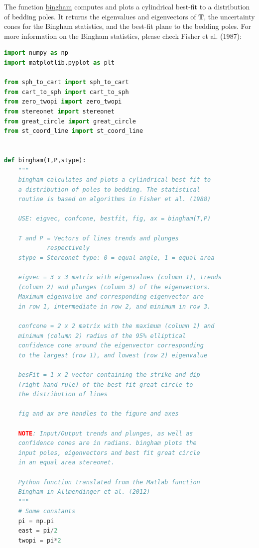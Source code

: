 \documentclass[a4paper , 12pt]{book}
\begin{document}
The function \href{https://github.com/nfcd/compGeo/blob/master/source/functions/bingham.py}{bingham} computes and plots a cylindrical best-fit to a distribution of bedding poles. It returns the eigenvalues and eigenvectors of $\mathbf{T}$, the uncertainty cones for the Bingham statistics, and the best-fit plane to the bedding poles. For more information on the Bingham statistics, please check Fisher et al. (1987):

\begin{center}
\begin{lstlisting}[language=Python, frame=single]
import numpy as np
import matplotlib.pyplot as plt

from sph_to_cart import sph_to_cart
from cart_to_sph import cart_to_sph
from zero_twopi import zero_twopi
from stereonet import stereonet
from great_circle import great_circle
from st_coord_line import st_coord_line


def bingham(T,P,stype):
	"""
	bingham calculates and plots a cylindrical best fit to
	a distribution of poles to bedding. The statistical
	routine is based on algorithms in Fisher et al. (1988)
	
	USE: eigvec, confcone, bestfit, fig, ax = bingham(T,P)
		
	T and P = Vectors of lines trends and plunges
			respectively
	stype = Stereonet type: 0 = equal angle, 1 = equal area
		
	eigvec = 3 x 3 matrix with eigenvalues (column 1), trends
	(column 2) and plunges (column 3) of the eigenvectors.
	Maximum eigenvalue and corresponding eigenvector are
	in row 1, intermediate in row 2, and minimum in row 3.
	
	confcone = 2 x 2 matrix with the maximum (column 1) and
	minimum (column 2) radius of the 95% elliptical
	confidence cone around the eigenvector corresponding
	to the largest (row 1), and lowest (row 2) eigenvalue
	
	besFit = 1 x 2 vector containing the strike and dip
	(right hand rule) of the best fit great circle to
	the distribution of lines
	
	fig and ax are handles to the figure and axes
	
	NOTE: Input/Output trends and plunges, as well as
	confidence cones are in radians. bingham plots the
	input poles, eigenvectors and best fit great circle
	in an equal area stereonet.
	
	Python function translated from the Matlab function
	Bingham in Allmendinger et al. (2012)
	"""
	# Some constants
	pi = np.pi
	east = pi/2
	twopi = pi*2
	

\end{lstlisting}
\end{center}
\end{document}
